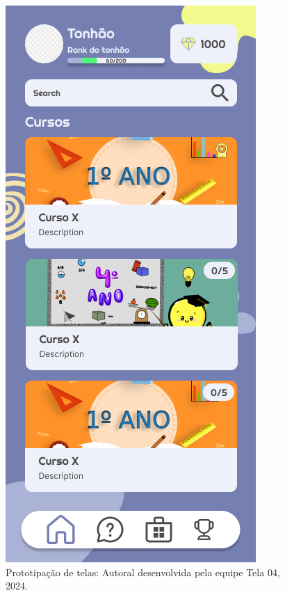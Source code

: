 \documentclass[12pt, openany, oneside, a4paper, english, brazil]{abntex2}   %
\begin{document}
\begin{figure}
    \centering
    \includegraphics[scale=0.7]{figuras/Math.Pow App/Courses Page.png}
    \caption{Prototipação de telas: Autoral desenvolvida pela equipe Tela 04, 2024.}
    \label{fig:nome-da-imagem}
\end{figure}
\end{document}
